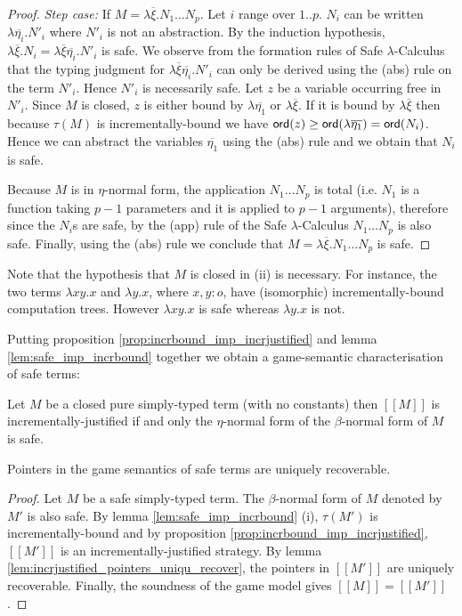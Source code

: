 \documentclass{llncs}
\newcommand\ord[1]{{\sf ord}(#1)}
\newcommand{\lsem}{[\![} %
\newcommand{\rsem}{]\!]} %
\newcommand{\sem}[1]{{\lsem #1 \rsem}}
\begin{document}
\begin{proof}
\emph{Step case:} If $M = \lambda \overline{\xi} . N_1 \ldots N_p$.
Let $i$ range over $1..p$. $N_i$ can be written $\lambda
\overline{\eta_i} . N'_i$ where $N'_i$ is not an abstraction. By the
induction hypothesis, $\lambda \overline{\xi} . N_i = \lambda
\overline{\xi} \overline{\eta_i} . N'_i$ is safe. We observe from
the formation rules of Safe $\lambda$-Calculus that the typing
judgment for $\lambda \overline{\xi} \overline{\eta_i} . N'_i$ can
only be derived using the (abs) rule on the term $N'_i$. Hence
$N'_i$ is necessarily safe. Let $z$ be a variable occurring free in
$N'_i$. Since $M$ is closed, $z$ is either bound by $\lambda
\overline{\eta_1}$ or $\lambda \overline{\xi}$. If it is bound by
$\lambda \overline{\xi}$ then because $\tau(M)$ is
incrementally-bound we have $\ord{z} \geq \ord{\lambda
\overline{\eta_1}} = \ord{N_i}$. Hence we can abstract the variables
$\overline{\eta_1}$ using the (abs) rule and we obtain that $N_i$ is
safe.

Because $M$ is in $\eta$-normal form, the application $N_1 \ldots
N_p$ is total (i.e. $N_1$ is a function taking $p-1$ parameters and
it is applied to $p-1$ arguments), therefore since the $N_i$s are
safe, by the (app) rule of the Safe $\lambda$-Calculus $N_1 \ldots
N_p$ is also safe. Finally, using the (abs) rule we conclude that $M
= \lambda \overline{\xi} . N_1 \ldots N_p$ is safe.
\end{proof}

Note that the hypothesis that $M$ is closed in (ii) is necessary.
For instance, the two terms $\lambda x y .x$ and $\lambda y . x$,
where $x,y:o$, have (isomorphic) incrementally-bound computation
trees. However $\lambda x y .x$ is safe whereas $\lambda y . x$ is
not.



Putting proposition \ref{prop:incrbound_imp_incrjustified} and lemma
\ref{lem:safe_imp_incrbound} together we obtain a game-semantic
characterisation of safe terms:
\begin{corollary}
Let $M$ be a closed pure simply-typed term (with no constants) then
$\sem{M}$  is incrementally-justified  if and only the $\eta$-normal form of the
$\beta$-normal form of $M$ is safe.
\end{corollary}



\begin{theorem}
\label{thm:safe_ptr_recoverable} Pointers in the game semantics of
safe terms are uniquely recoverable.
\end{theorem}
\begin{proof}
Let $M$ be a safe simply-typed term. The $\beta$-normal form of $M$
denoted by $M'$ is also safe. By lemma \ref{lem:safe_imp_incrbound}
(i), $\tau(M')$ is incrementally-bound and by proposition
\ref{prop:incrbound_imp_incrjustified}, $\sem{M'}$ is an
incrementally-justified strategy. By lemma
\ref{lem:incrjustified_pointers_uniqu_recover}, the pointers in
$\sem{M'}$ are uniquely recoverable. Finally, the soundness of the
game model gives $\sem{M} = \sem{M'}$.
\end{proof}
\end{document}

